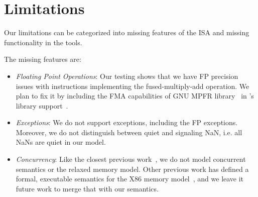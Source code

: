 \section{Limitations}\label{sec:limit}
Our limitations can be categorized into missing features of the \ISA ISA and missing functionality in the \K tools.

The missing \ISA features are:
%
\begin{itemize}
 \item {\em Floating Point Operations\/}: Our testing shows that we have FP precision issues with instructions implementing the fused-multiply-add operation. We plan to fix it by including the FMA capabilities of GNU MPFR library~\cite{GNUMPFR} in \K's library support~\cite{MPFRJAVA}.
 \item {\em Exceptions\/}: We do not support exceptions, including the FP exceptions. Moreover, we do not distinguish between quiet and signaling NaN, i.e. all NaNs are quiet in our model.
 \item {\em Concurrency\/}: Like the closest previous work~\cite{Goel:FMCAD14,Heule2016a}, we do not model concurrent semantics or the relaxed memory model. Other previous work has defined a formal, executable semantics for the X86 memory model~\cite{Sarkar:POPL09,Owens:x86-TSO}, and we leave it future work to merge that with our semantics.   
\end{itemize}
